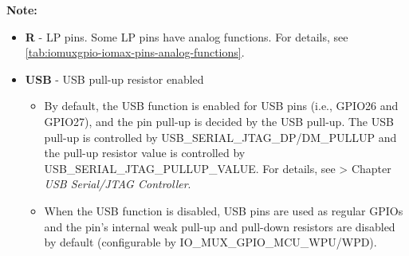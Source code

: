 \textbf{Note:}

\begin{itemize}
\item \textbf{R} - LP pins. Some LP pins have analog functions. For details, see \ref{tab:iomuxgpio-iomax-pins-analog-functions}.
\item \textbf{USB} - USB pull-up resistor enabled 
\begin{itemize}
    \item By default, the USB function is enabled for USB pins (i.e., GPIO26 and GPIO27), and the pin pull-up is decided by the USB pull-up. The USB pull-up is controlled by USB\_SERIAL\_JTAG\_DP/DM\_PULLUP and the pull-up resistor value is controlled by USB\_SERIAL\_JTAG\_PULLUP\_VALUE. For details, see  > Chapter \textit{USB Serial/JTAG Controller}.
    \item When the USB function is disabled, USB pins are used as regular GPIOs and the pin's internal weak pull-up and pull-down resistors are disabled by default (configurable by IO\_MUX\_GPIO\_MCU\_WPU/WPD).
\end{itemize}
\end{itemize}
